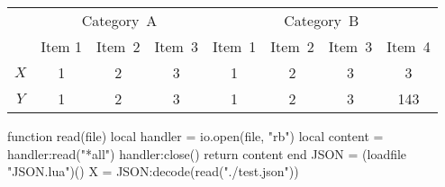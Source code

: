\documentclass[
12pt, 
english, 
oneside,
doublespacing, %
]{Thesis} %
\author{Mayra \textsc{Valdés}}
\begin{document}
\frontmatter %

\begin{tabular}{c@{\qquad}ccc@{\qquad}cccc}
	\toprule
	\multirow{2}{*}{\raisebox{-\heavyrulewidth}{Title}} & \multicolumn{3}{c}{Category~A} & \multicolumn{4}{c}{Category~B} \\
	\cmidrule{2-8}
	& Item 1 & Item~2 & Item~3 & Item~1 & Item~2 & Item~3 & Item~4 \\
	\midrule
	$X$ & 1 & 2 & 3 & 1 & 2 & 3 & 3 \\
	$Y$ & 1 & 2 & 3 & 1 & 2 & 3 & 143 \\
	\bottomrule
\end{tabular}

\begin{luacode}
	function read(file)
		local handler = io.open(file, "rb")
		local content = handler:read("*all")
		handler:close()
		return content
	end
	JSON = (loadfile "JSON.lua")()
	X = JSON:decode(read("./test.json"))
\end{luacode}

\pagestyle{plain} %












\mainmatter %



% 
%
% 
% 


\appendix %


%
%


\printbibliography[heading=bibintoc]

\end{document}
